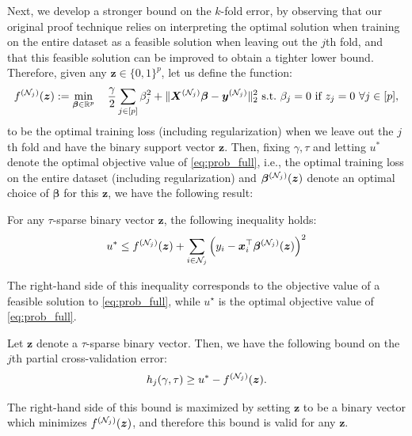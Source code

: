 \documentclass[mnsc,nonblindrev]{informs3} %
\newcommand{\ag}[1]{{\color{black}#1}}
\begin{document}
Next, we develop a stronger bound on the $k$-fold error, by observing that our original proof technique relies on interpreting the optimal solution when training on the entire dataset as a feasible solution when leaving out the \ag{$j$}th fold, and that this feasible solution can be improved to obtain a tighter lower bound. Therefore, {given \ag{any} $\bm{z}\in \{0,1\}^p$,} let us define the function:{\color{black}
\begin{align*}
    f^{(\ag{\mathcal{N}_j})}(\bm{z}):=\min_{\bm{\beta} \in \mathbb{R}^p} \quad \frac{\gamma}{2}\sum_{j \in [p]}\beta_j^2+\Vert \bm{X}^{(\ag{\mathcal{N}_j})}\bm{\beta}-\bm{y}^{(\ag{\mathcal{N}_j})}\Vert_2^2 \ \text{s.t.} \ \beta_j=0 \ \text{if} \ z_j=0 \ \forall j \in [p],
\end{align*}}
to be the optimal training loss (including regularization) when we leave out the \ag{$j$th fold} and have the binary support vector $\bm{z}$. Then, fixing $\gamma, \tau$ and letting $u^*$ denote the optimal objective value of \eqref{eq:prob_full}, i.e., the optimal training loss on the entire dataset (including regularization) and $\bm{\beta}^{(\ag{\mathcal{N}_j})}(\bm{z})$ denote an optimal choice of $\bm{\beta}$ for this $\bm{z}$, we have the following result:
\begin{proposition}\label{prop2}
For any $\tau$-sparse binary vector $\bm{z}$, the following inequality holds:
\begin{align}
    u^*\leq f^{(\ag{\mathcal{N}_j})}(\bm{z})+\ag{\sum_{i\in \mathcal{N}_j}}\left(y_i-\bm{x}_i^\top \bm{\beta}^{(\ag{\mathcal{N}_j})}(\bm{z})\right)^2
\end{align}
\end{proposition}
The right-hand side of this inequality corresponds to the objective value of a feasible solution to \eqref{eq:prob_full}, while {\color{black}$u^\star$} is the optimal objective value of \eqref{eq:prob_full}. \Halmos
\endproof
\begin{corollary}\label{corr:lowerbound2}
Let $\bm{z}$ denote a $\tau$-sparse binary vector. Then, we have the following bound on the $j$th partial \ag{cross-validation} error:
\begin{align}\label{eq:LOOLower}
    h_j(\gamma, \tau) \geq u^*-f^{(\ag{\mathcal{N}_j})}(\bm{z}).
\end{align}
\end{corollary}
The right-hand side of this bound is maximized by setting $\bm{z}$ to be a binary vector which minimizes $f^{(\ag{\mathcal{N}_j})}(\bm{z})$, and therefore this bound is valid for any $\bm{z}$. \Halmos
\end{document}
